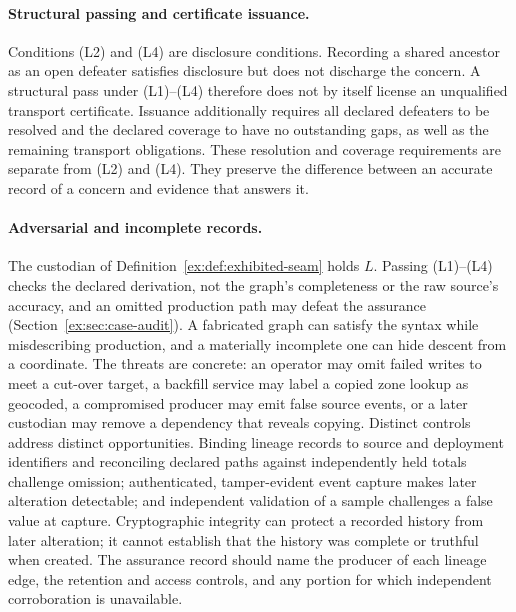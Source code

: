 \documentclass[11pt]{article}
\theoremstyle{definition}
\begin{document}
\paragraph{Structural passing and certificate issuance.}
Conditions (L2) and (L4) are disclosure conditions. Recording a shared ancestor as an open defeater satisfies disclosure but does not discharge the concern. A structural pass under (L1)--(L4) therefore does not by itself license an unqualified transport certificate. Issuance additionally requires all declared defeaters to be resolved and the declared coverage to have no outstanding gaps, as well as the remaining transport obligations. These resolution and coverage requirements are separate from (L2) and (L4). They preserve the difference between an accurate record of a concern and evidence that answers it.

\paragraph{Adversarial and incomplete records.} The custodian of Definition~\ref{ex:def:exhibited-seam} holds $L$. Passing (L1)--(L4) checks the declared derivation, not the graph's completeness or the raw source's accuracy, and an omitted production path may defeat the assurance (Section~\ref{ex:sec:case-audit}). A fabricated graph can satisfy the syntax while misdescribing production, and a materially incomplete one can hide descent from a coordinate. The threats are concrete: an operator may omit failed writes to meet a cut-over target, a backfill service may label a copied zone lookup as geocoded, a compromised producer may emit false source events, or a later custodian may remove a dependency that reveals copying. Distinct controls address distinct opportunities. Binding lineage records to source and deployment identifiers and reconciling declared paths against independently held totals challenge omission; authenticated, tamper-evident event capture makes later alteration detectable; and independent validation of a sample challenges a false value at capture. Cryptographic integrity can protect a recorded history from later alteration; it cannot establish that the history was complete or truthful when created. The assurance record should name the producer of each lineage edge, the retention and access controls, and any portion for which independent corroboration is unavailable.
\end{document}
